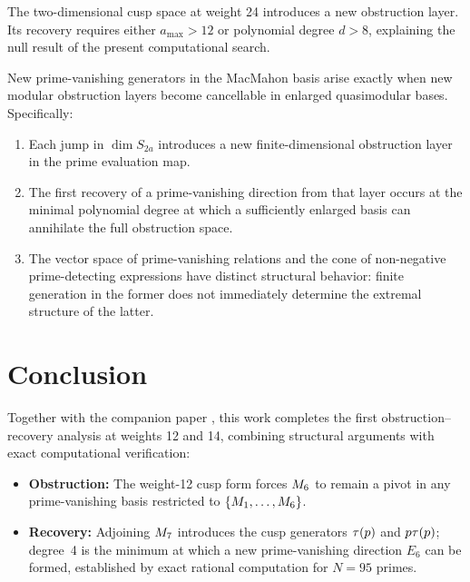\documentclass[11pt]{article}
\begin{document}
\begin{conjecture}
\label{conj:weight24}
The two-dimensional cusp space at weight 24 introduces a new obstruction layer.
Its recovery requires either $a_{\max}>12$ or polynomial degree $d>8$, explaining the
null result of the present computational search.
\end{conjecture}

\begin{conjecture}
\label{conj:general}
New prime-vanishing generators in the MacMahon basis arise exactly when new modular
obstruction layers become cancellable in enlarged quasimodular bases.
Specifically:
\begin{enumerate}[label=(\roman*)]
  \item Each jump in $\dim S_{2a}$ introduces a new finite-dimensional obstruction
        layer in the prime evaluation map.
  \item The first recovery of a prime-vanishing direction from that layer occurs at the
        minimal polynomial degree at which a sufficiently enlarged basis can annihilate
        the full obstruction space.
  \item The vector space of prime-vanishing relations and the cone of non-negative
        prime-detecting expressions have distinct structural behavior: finite generation
        in the former does not immediately determine the extremal structure of the
        latter.
\end{enumerate}
\end{conjecture}

\section{Conclusion}
\label{sec:conclusion}

Together with the companion paper \cite{Randsley2025a}, this work completes the first
obstruction–recovery analysis at weights 12 and 14, combining structural arguments
with exact computational verification:
\begin{itemize}[leftmargin=*]
  \item \textbf{Obstruction:} The weight-12 cusp form forces $M_{6}$ to remain a pivot
        in any prime-vanishing basis restricted to $\{M_{1},\dots,M_{6}\}$.
  \item \textbf{Recovery:} Adjoining $M_{7}$ introduces the cusp generators
        $\tau(p)$ and $p\tau(p)$; degree~4 is the minimum at which a new
        prime-vanishing direction $E_6$ can be formed, established by exact rational
        computation for $N=95$ primes.
\end{itemize}
\end{document}
